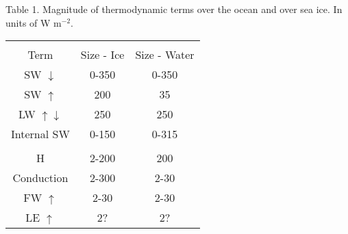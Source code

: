 \textwidth=7.0in
\oddsidemargin=-0.5in


\begin{center}
Table 1. Magnitude of thermodynamic terms over the ocean and over sea ice.
\linebreak In units of W m$^{-2}$.

\begin{tabular}{ccc}
&&\\
Term & Size - Ice & Size - Water\\
\hline
\hline 

SW $\downarrow$ & 0-350 & 0-350 \\
SW $\uparrow$   & 200   & 35 \\
LW $\uparrow \downarrow $ & 250 & 250 \\
Internal SW & 0-150 & 0-315 \\

& & \\

H & 2-200 & 200 \\
Conduction & 2-300 & 2-30 \\
FW $\uparrow$ & 2-30 & 2-30 \\
LE $\uparrow$ & 2?  & 2? \\
\hline

\end{tabular}
\end{center}

